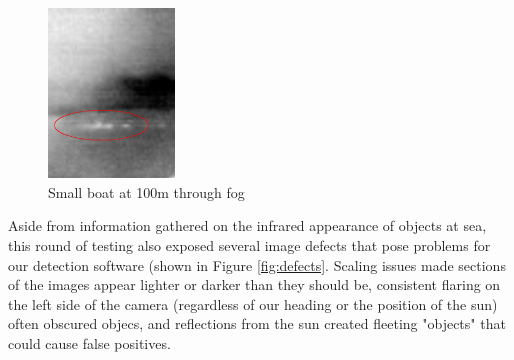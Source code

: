 \begin{figure}
\centering
\includegraphics[width=0.3\textwidth]{"./image/shore_fog_circled"}
\caption{Small boat at 100m through fog}
\label{fig:shore_fog}
\end{figure}

Aside from information gathered on the infrared appearance of objects at sea, this round of testing also exposed several image defects that pose problems for our detection software (shown in Figure \ref{fig:defects}. Scaling issues made sections of the images appear lighter or darker than they should be, consistent flaring on the left side of the camera (regardless of our heading or the position of the sun) often obscured objecs, and reflections from the sun created fleeting "objects" that could cause false positives. 

